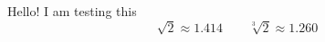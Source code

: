 \documentclass{article}
\begin{document}
Hello! I am testing this
\[\sqrt{2}\approx1.414\qquad\sqrt[3]{2}\approx1.260\]
\end{document}

